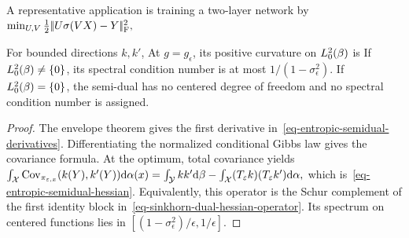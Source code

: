 A representative application is training a two-layer network by \(\min_{U,V}\frac12|\!| U\sigma(VX)-Y |\!|_{\rm F}^2,\)
\begin{prop}\label{prop-sinkhorn-semidual-curvature}
For bounded directions $k,k'$,
At $g=g_\epsilon$, its positive curvature on $L_0^2(\beta)$ is
If $L_0^2(\beta)\neq\{0\}$, its spectral condition number is at most
\(
1/(1-\sigma_\epsilon^2)
\). If $L_0^2(\beta)=\{0\}$, the semi-dual has no centered degree of freedom and no spectral condition number is assigned.
\end{prop}
\begin{proof}
The envelope theorem gives the first derivative in~\eqref{eq-entropic-semidual-derivatives}. Differentiating the normalized conditional Gibbs law gives the covariance formula. At the optimum, total covariance yields
\(\int_{\mathcal{X}} \operatorname{Cov}_{\pi_{\varepsilon,x}}(k(Y),k'(Y)) \mathrm{d}\alpha(x) = \int_{\mathcal{Y}} kk'\mathrm{d}\beta - \int_{\mathcal{X}}(T_\varepsilon k)(T_\varepsilon k')\mathrm{d}\alpha,\)
which is~\eqref{eq-entropic-semidual-hessian}. Equivalently, this operator is the Schur complement of the first identity block in~\eqref{eq-sinkhorn-dual-hessian-operator}. Its spectrum on centered functions lies in
\(
[(1-\sigma_\epsilon^2)/\epsilon,1/\epsilon]
\).
\end{proof}
